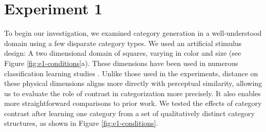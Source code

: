 \documentclass[pdflatex,sn-apa]{sn-jnl}%
\theoremstyle{thmstyleone}%
\theoremstyle{thmstyletwo}%
\theoremstyle{thmstylethree}%
\begin{document}
%
%

\section{Experiment 1}
To begin our investigation, we examined category generation in a well-understood domain using a few disparate category types. We used an
artificial stimulus design: A two dimensional domain of squares, varying in
color and size (see Figure \ref{fig:e1-conditions}a). These dimensions
have been used in numerous classification learning studies
\cite[e.g.,][]{conaway2016similar,conaway2016generalization,shepard1961learning,nosofsky1994comparing}.
Unlike those used in the \cite{jern2013probabilistic} experiments, distance on
these physical dimensions aligns more directly with perceptual similarity,
allowing us to evaluate the role of  contrast in categorization
more precisely. It also enables more straightforward comparisons to prior work. We tested the effects of category contrast after learning one category from a set of qualitatively distinct category structures, as shown in Figure \ref{fig:e1-conditions}.
\end{document}
